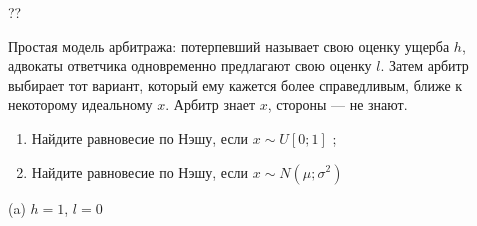 \begin{problem}
\begin{source}
\cite{gibbons:ae}??
\end{source}
Простая модель арбитража: потерпевший называет свою оценку ущерба  $h$, адвокаты ответчика одновременно предлагают свою оценку  $l$. Затем арбитр выбирает тот вариант, который ему кажется более справедливым, ближе к некоторому идеальному  $x$. Арбитр знает  $x$, стороны --- не знают.\par
\begin{enumerate}
\item Найдите равновесие по Нэшу, если  $x\sim U\left[0;1\right]$ ;\par
\item Найдите равновесие по Нэшу, если  $x\sim N\left(\mu ;\sigma ^{2} \right)$
\end{enumerate}

\begin{sol}
(a) $h=1$, $l=0$
\end{sol}
\end{problem}



